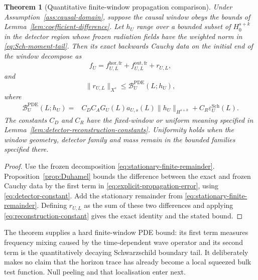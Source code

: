 \documentclass[11pt,a4paper]{article}
\newtheorem{theorem}{Theorem}[section]
\theoremstyle{definition}
\theoremstyle{remark}
\begin{document}
	\begin{theorem}[Quantitative finite-window propagation comparison]
		\label{thm:target}
		Under Assumption~\ref{ass:causal-domain}, suppose the causal window obeys the bounds of
		Lemma~\ref{lem:coefficient-difference}.  Let $h_U$ range over a
		bounded subset of $H^{s+k}_0$ in the detector region whose frozen radiation
		fields have the weighted norm in \eqref{eq:Sch-moment-tail}.  Then its exact
		backwards Cauchy data on the initial end of the window decompose as
		\begin{equation}
			f_U=f^{\mathrm{hor,fr}}_{U,L}+f^{\mathrm{out,fr}}_{U,L}+r_{U,L},
			\label{eq:proved-dynamical-decomposition}
		\end{equation}
		and
		\begin{equation}
			\|r_{U,L}\|_{X^s}
			\leq \mathcal B_U^{\mathrm{PDE}}(L;h_U),
			\label{eq:target-propagation-bound}
		\end{equation}
		where
		\begin{align}
			\mathcal B_U^{\mathrm{PDE}}(L;h_U)={}&
			C_D C_A G_U(L)a_{U,s}(L)\|h_U\|_{H^{s+k}}
			+C_R\varepsilon^{\mathrm{Sch}}_U(L).
			\label{eq:explicit-propagation-error}
		\end{align}
		The constants $C_D$ and $C_R$ have the fixed-window or uniform meaning
		specified in Lemma~\ref{lem:detector-reconstruction-constants}.  Uniformity
		holds when the window geometry, detector family and mass remain in the
		bounded families specified there.
	\end{theorem}
	
	\begin{proof}
		Use the frozen decomposition \eqref{eq:stationary-finite-remainder}.
		Proposition~\ref{prop:Duhamel} bounds the difference between the exact and
		frozen Cauchy data by the first term in
		\eqref{eq:explicit-propagation-error}, using
		\eqref{eq:detector-constant}.  Add the stationary remainder
		from \eqref{eq:stationary-finite-remainder}.  Defining $r_{U,L}$ as the sum of
		these two differences and applying \eqref{eq:reconstruction-constant} gives
		the exact identity and the stated bound.
	\end{proof}
	
	The theorem supplies a hard finite-window PDE bound: its first term measures frequency
	mixing caused by the time-dependent wave operator and its second term is the
	quantitatively decaying Schwarzschild boundary tail.  It deliberately makes
	no claim that the horizon trace has already become a local squeezed bulk test
	function.  Null peeling and that localisation enter next.
	
\end{document}
